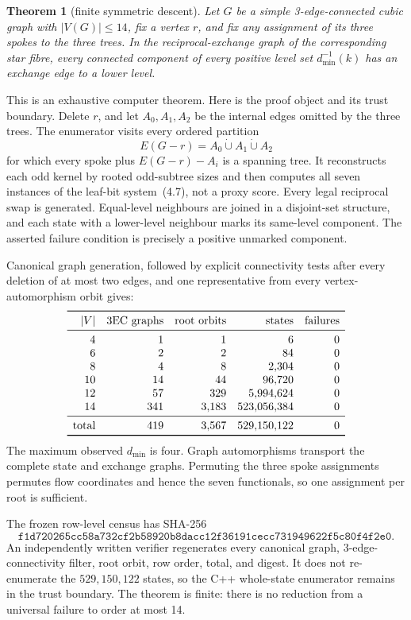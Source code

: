 \documentclass[11pt]{article}
\newtheorem{theorem}{Theorem}[section]
\theoremstyle{definition}
\theoremstyle{remark}
\newcommand{\1}{\mathbf 1}
\begin{document}
\begin{theorem}[finite symmetric descent]\label{thm:fano-descent}
Let \(G\) be a simple 3-edge-connected cubic graph with
\(|V(G)|\leq14\), fix a vertex \(r\), and fix any assignment of its three
spokes to the three trees.  In the reciprocal-exchange graph of the
corresponding star fibre, every connected component of every positive
level set \(d_{\min}^{-1}(k)\) has an exchange edge to a lower level.
\end{theorem}

This is an exhaustive computer theorem.  Here is the proof object and its
trust boundary.  Delete \(r\), and let \(A_0,A_1,A_2\) be the internal
edges omitted by the three trees.  The enumerator visits every ordered
partition
\[
 E(G-r)=A_0\mathbin{\dot\cup}A_1\mathbin{\dot\cup}A_2
\]
for which every spoke plus \(E(G-r)-A_i\) is a spanning tree.  It
reconstructs each odd kernel by rooted odd-subtree sizes and then computes
all seven instances of the leaf-bit system~(4.7), not a proxy score.
Every legal reciprocal swap is generated.  Equal-level neighbours are
joined in a disjoint-set structure, and each state with a lower-level
neighbour marks its same-level component.  The asserted failure condition
is precisely a positive unmarked component.

Canonical graph generation, followed by explicit connectivity tests after
every deletion of at most two edges, and one representative from every
vertex-automorphism orbit gives:
\[
\begin{array}{rrrrr}
\toprule
|V|&\text{3EC graphs}&\text{root orbits}&\text{states}&\text{failures}\\
\midrule
4&1&1&6&0\\
6&2&2&84&0\\
8&4&8&2{,}304&0\\
10&14&44&96{,}720&0\\
12&57&329&5{,}994{,}624&0\\
14&341&3{,}183&523{,}056{,}384&0\\
\midrule
\text{total}&419&3{,}567&529{,}150{,}122&0\\
\bottomrule
\end{array}
\]
The maximum observed \(d_{\min}\) is four.  Graph automorphisms transport
the complete state and exchange graphs.  Permuting the three spoke
assignments permutes flow coordinates and hence the seven functionals, so
one assignment per root is sufficient.

The frozen row-level census has SHA-256
\[
\texttt{f1d720265cc58a732cf2b58920b8dacc12f36191cecc731949622f5c80f4f2e0}.
\]
An independently written verifier regenerates every canonical graph,
3-edge-connectivity filter, root orbit, row order, total, and digest.
It does not re-enumerate the \(529{,}150{,}122\) states, so the C++
whole-state enumerator remains in the trust boundary.  The theorem is
finite: there is no reduction from a universal failure to order at most
14.
\end{document}
